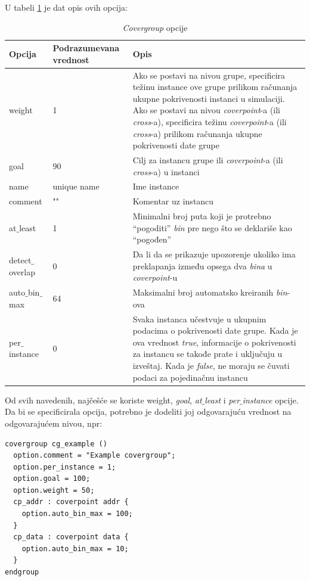 U tabeli \ref{tab:cg_options} je dat opis ovih opcija:\\

\begin{table}[h!]
  \centering
  \begin{tabular}{|p{}|p{}|p{}|}
    \hline
    \textbf{Opcija} & \textbf{Podrazumevana vrednost} & \textbf{Opis}\\
    \hline
    weight & 1 & Ako se postavi na nivou grupe, specificira težinu instance ove grupe prilikom računanja ukupne pokrivenosti instanci u simulaciji. Ako se postavi na nivou \emph{coverpoint}-a (ili \emph{cross}-a), specificira težinu \emph{coverpoint}-a (ili \emph{cross}-a) prilikom računanja ukupne pokrivenosti date grupe\\
    \hline
    goal & 90 & Cilj za instancu grupe ili \emph{coverpoint}-a (ili \emph{cross}-a) u instanci\\
    \hline
    name & unique name & Ime instance\\
    \hline
    comment & "" & Komentar uz instancu\\
    \hline
    at\(\_\)least & 1 & Minimalni broj puta koji je protrebno ``pogoditi'' \emph{bin} pre nego što se deklariše kao ``pogođen''\\
    \hline
    detect\(\_\)overlap & 0 & Da li da se prikazuje upozorenje ukoliko ima preklapanja između opsega dva \emph{bina} u \emph{coverpoint}-u\\
    \hline
    auto\(\_\)bin\(\_\)max & 64 & Maksimalni broj automatsko kreiranih \emph{bin}-ova\\
    \hline
    per\(\_\)instance & 0 & Svaka instanca učestvuje u ukupnim podacima o pokrivenosti date grupe. Kada je ova vrednost \emph{true}, informacije o pokrivenosti za instancu se takođe prate i uključuju u izveštaj. Kada je \emph{false}, ne moraju se čuvati podaci za pojedinačnu instancu\\
    \hline
  \end{tabular}
  \caption{\emph{Covergroup} opcije}
  \label{tab:cg_options}
\end{table}

Od svih navedenih, najčešće se koriste weight, \emph{goal}, \emph{at\(\_\)least}
i \emph{per\(\_\)instance} opcije. Da bi se specificirala opcija, potrebno je
dodeliti joj odgovarajuću vrednost na odgovarajućem nivou, npr:

\begin{lstlisting}
covergroup cg_example ()
  option.comment = "Example covergroup";
  option.per_instance = 1;
  option.goal = 100;
  option.weight = 50;
  cp_addr : coverpoint addr {
    option.auto_bin_max = 100;
  }
  cp_data : coverpoint data {
    option.auto_bin_max = 10;
  }
endgroup
\end{lstlisting}

